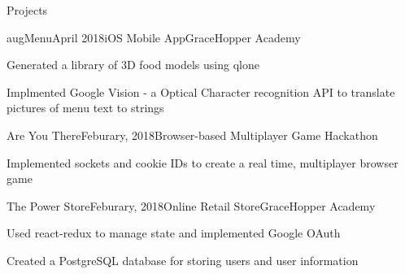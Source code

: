 \documentclass{resume} %
\begin{document}
    \begin{rSection}{Projects}
    \begin{rSubsection}{augMenu}{April 2018}{iOS Mobile App}{GraceHopper Academy}
    \item Generated a library of 3D food models using qlone
    \item Implmented Google Vision - a Optical Character recognition API to translate pictures of menu text to strings 
    \end{rSubsection}
    \begin{rSubsection}{Are You There}{Feburary, 2018}{Browser-based Multiplayer Game}{ Hackathon}
    \item Implemented sockets and cookie IDs to create a real time, multiplayer browser game
    \end{rSubsection}
    \begin{rSubsection}{The Power Store}{Feburary, 2018}{Online Retail Store}{GraceHopper Academy}
        \item Used react-redux to manage state and implemented Google OAuth
        \item Created a PostgreSQL database for storing users and user information
        \end{rSubsection}
    \end{rSection}
    
    
    
    
\end{document}
